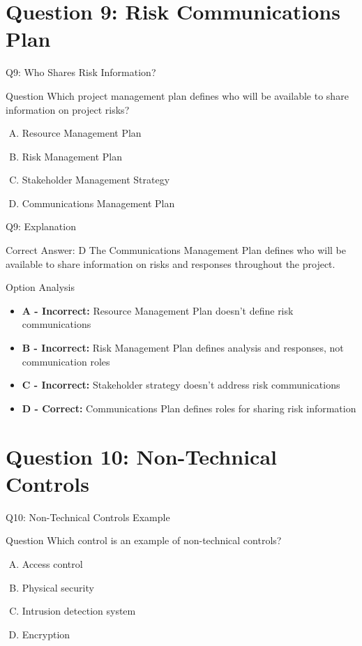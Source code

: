 \documentclass{beamer}
\begin{document}
	\section{Question 9: Risk Communications Plan}
	
	\begin{frame}{Q9: Who Shares Risk Information?}
		\begin{block}{Question}
			Which project management plan defines who will be available to share information on project risks?
		\end{block}
		\begin{enumerate}[(A)]
			\item Resource Management Plan
			\item Risk Management Plan
			\item Stakeholder Management Strategy
			\item Communications Management Plan
		\end{enumerate}
	\end{frame}
	
	\begin{frame}{Q9: Explanation}
		\begin{block}{Correct Answer: D}
			The Communications Management Plan defines who will be available to share information on risks and responses throughout the project.
		\end{block}
		\begin{block}{Option Analysis}
			\begin{itemize}
				\item \textbf{A - Incorrect:} Resource Management Plan doesn't define risk communications
				\item \textbf{B - Incorrect:} Risk Management Plan defines analysis and responses, not communication roles
				\item \textbf{C - Incorrect:} Stakeholder strategy doesn't address risk communications
				\item \textbf{D - Correct:} Communications Plan defines roles for sharing risk information
			\end{itemize}
		\end{block}
	\end{frame}
	
	\section{Question 10: Non-Technical Controls}
	
	\begin{frame}{Q10: Non-Technical Controls Example}
		\begin{block}{Question}
			Which control is an example of non-technical controls?
		\end{block}
		\begin{enumerate}[(A)]
			\item Access control
			\item Physical security
			\item Intrusion detection system
			\item Encryption
		\end{enumerate}
	\end{frame}
	
\end{document}

